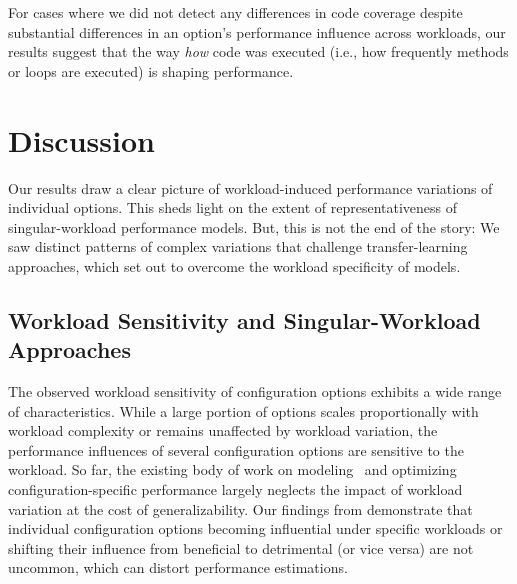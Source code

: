 {{{For cases where we did not detect any differences in code coverage despite substantial differences in an option's performance influence across workloads, our results suggest that the way \emph{how} code was executed (i.e., how frequently methods or loops are executed) is shaping performance.

\color{black}
\section{Discussion}\label{sec:discussion}
Our results draw a clear picture of workload-induced performance variations of individual options. This sheds light on the extent of representativeness of singular-workload performance models. But, this is not the end of the story: We saw distinct patterns of complex variations that challenge transfer-learning approaches, which set out to overcome the workload specificity of models.


\subsection{Workload Sensitivity and Singular-Workload Approaches}
The observed workload sensitivity of configuration options exhibits a wide range of characteristics. While a large portion of options scales proportionally with workload complexity or remains unaffected by workload variation, the performance influences of several configuration options are sensitive to the workload.  So far, the existing body of work on modeling~\cite{dorn2020,siegmundPerformanceinfluenceModelsHighly2015,haDeepPerf2019,perfAL,guoVariabilityawarePerformancePrediction2013,sarkarCostEfficientSamplingPerformance,guo_2018_data,fourier_learning_2015,perLasso} and optimizing~\cite{chen_mmo_2021,nairUsingBadLearners2017,nairFlash18,ohFindingNearoptimalConfigurations2017} configuration-specific performance largely neglects the impact of workload variation at the cost of generalizability. 
Our findings from  demonstrate that individual configuration options becoming influential under specific workloads or shifting their influence from beneficial to detrimental (or vice versa) are not uncommon, which can distort performance estimations.

}}}
